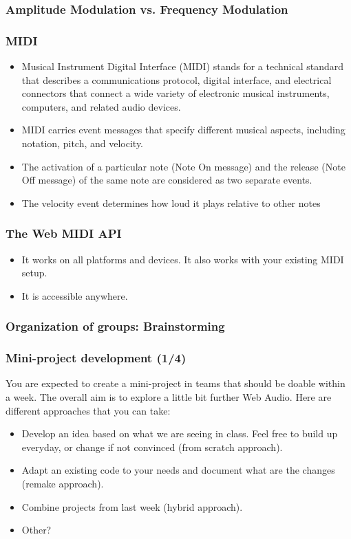 \documentclass[screen, aspectratio=43]{beamer}
\begin{document}
%
\begin{frame}
\frametitle{Amplitude Modulation vs. Frequency Modulation}
\end{frame}
%
\begin{frame}
\frametitle{MIDI}
\begin{itemize}
\item Musical Instrument Digital Interface (MIDI) stands for a technical standard that describes a communications protocol, digital interface, and electrical connectors that connect a wide variety of electronic musical instruments, computers, and related audio devices.
\item MIDI carries event messages that specify different musical aspects, including notation, pitch, and velocity.
\item The activation of a particular note (Note On message) and the release (Note Off message) of the same note are considered as two separate events.
\item The velocity event determines how loud it plays relative to other notes
\end{itemize}
\end{frame}
%
\begin{frame}
\frametitle{The Web MIDI API}
\begin{itemize}
\item It works on all platforms and devices. It also works with your existing MIDI setup.
\item It is accessible anywhere.
\end{itemize}
\end{frame}
%
\begin{frame}
\frametitle{Organization of groups: Brainstorming}
\end{frame}
%
\begin{frame}
\frametitle{Mini-project development (1/4)}
You are expected to create a mini-project in teams that should be doable within a week. The overall aim is to explore a little bit further Web Audio. Here are different approaches that you can take:
\begin{itemize}
\item Develop an idea based on what we are seeing in class. Feel free to build up everyday, or change if not convinced (from scratch approach).
\item Adapt an existing code to your needs and document what are the changes (remake approach).
\item Combine projects from last week (hybrid approach).
\item Other?
\end{itemize}
\end{frame}
\end{document}
